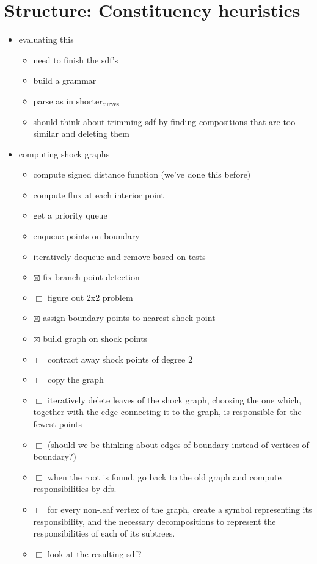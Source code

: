\documentclass{book}
\begin{document}
\section{Structure: Constituency heuristics}
\label{sec-5_4}

\begin{itemize}
\item evaluating this

\begin{itemize}
\item need to finish the sdf's
\item build a grammar
\item parse as in shorter$_{\mathrm{curves}}$
\item should think about trimming sdf by finding compositions that are
      too similar and deleting them
\end{itemize}

\item computing shock graphs

\begin{itemize}
\item compute signed distance function (we've done this before)
\item compute flux at each interior point
\item get a priority queue
\item enqueue points on boundary
\item iteratively dequeue and remove based on tests
\item $\boxtimes$ fix branch point detection
\item $\Box$ figure out 2x2 problem
\item $\boxtimes$ assign boundary points to nearest shock point
\item $\boxtimes$ build graph on shock points
\item $\Box$ contract away shock points of degree 2
\item $\Box$ copy the graph
\item $\Box$ iteratively delete leaves of the shock graph, choosing the one
      which, together with the edge connecting it to the graph, is
      responsible for the fewest points
\item $\Box$ (should we be thinking about edges of boundary instead of
      vertices of boundary?)
\item $\Box$ when the root is found, go back to the old graph and compute
      responsibilities by dfs.
\item $\Box$ for every non-leaf vertex of the graph, create a symbol
      representing its responsibility, and the necessary
      decompositions to represent the responsibilities of each of its
      subtrees.
\item $\Box$ look at the resulting sdf?
\end{itemize}


\end{itemize}
\end{document}
